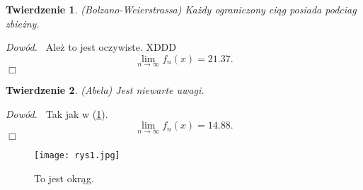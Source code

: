 \documentclass[12pt]{report}
\newtheorem{tw}{Twierdzenie}
\newenvironment{dow}{\par \noindent \emph{Dowód.\ }}{\hfill $\Box$ \par}
\begin{document}
	\thispagestyle{empty}
	\begin{tw} 
		\label{bolwei}
		(Bolzano-Weierstrassa) \newline
		Każdy ograniczony ciąg posiada \emph{podciag zbieżny}.
	\end{tw}
	\begin{dow}
		Ależ to jest oczywiste. XDDD
		$$\lim_{n\to\infty}f_n(x) = 21.37.$$
	\end{dow}
	\begin{tw} 
		\label{abel}
		(Abela) \newline
		Jest niewarte uwagi.
	\end{tw}
	\begin{dow}
		Tak jak w (\ref{bolwei}).
		$$\lim_{n\to\infty}f_n(x) = 14.88.$$
	\end{dow}
	\begin{figure}[h]
		\begin{center}
			\texttt{[image: rys1.jpg]}
		\end{center}
		\caption{To jest okrąg.}
	\end{figure}
\end{document}
